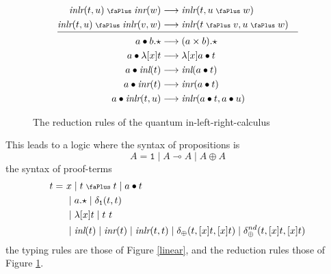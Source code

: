 \documentclass[screen, sigconf,authorversion,nonacm]{acmart}
\theoremstyle{acmdefinition}
\numberwithin{equation}{section}
\newcommand\abstr[1]{[#1]}
\newcommand\inl{\mbox{\it inl}}
\newcommand\inr{\mbox{\it inr}}
\newcommand\inlr{\mbox{\it inlr}}
\newcommand\plus{\mathrel{\text{\normalfont\scalebox{0.7}{\faPlus}}}}
\newcommand\one{\ensuremath{\mathtt 1}}
\newcommand\elimone{\delta_{\one}}
\newcommand\elimplus{\delta_{\oplus}}
\begin{document}
\begin{figure}[t]
\begin{align}
    \label{ll:rusuminlrinl}\\
    \inlr(t,u) \plus \inr(w) & \longrightarrow  \inlr(t,u \plus w)
    \label{ll:rusuminlrinr}\\
    \inlr(t,u) \plus \inlr(v,w) & \longrightarrow  \inlr(t \plus v,u \plus w)
    \label{ll:rusuminlr}\\[1pt]\hline\nonumber\\[-11pt]
      a \bullet b.\star&\longrightarrow  (a \times b).\star
    \label{ll:rubulletstar}\\
      a \bullet \lambda \abstr{x} t &\longrightarrow  \lambda \abstr{x} a \bullet t
    \label{ll:rubulletlam}\\
    a \bullet \inl(t) & \longrightarrow  \inl(a \bullet t)
    \label{ll:rubulletinl}\\
    a \bullet \inr(t) & \longrightarrow  \inr(a \bullet t)
    \label{ll:rubulletinr}\\
    a \bullet \inlr(t,u)  & \longrightarrow  \inlr(a \bullet t,a \bullet u)
    \label{ll:rubulletinlr}
    \end{align}
  \caption{The reduction rules of the quantum in-left-right-calculus\label{linearreductionrules}}
\end{figure}

This leads to a logic where the syntax of propositions is
\[
  A = \one \mid A \multimap A \mid A \oplus A
\]
the syntax of proof-terms
\begin{align*}
t = ~ & x  \mid t \plus t \mid a \bullet t\\
  & \mid a.\star \mid \elimone(t,t)\\
  & \mid \lambda \abstr{x}t \mid t~t\\
  & \mid \inl(t) \mid \inr(t) \mid \inlr(t,t)
    \mid \elimplus(t,\abstr{x}t,\abstr{x}t)
    \mid \elimplus^{nd}(t,\abstr{x}t,\abstr{x}t)
\end{align*}
the typing rules are those of Figure \ref{linear}, and the reduction
rules those of Figure \ref{linearreductionrules}.
\end{document}
